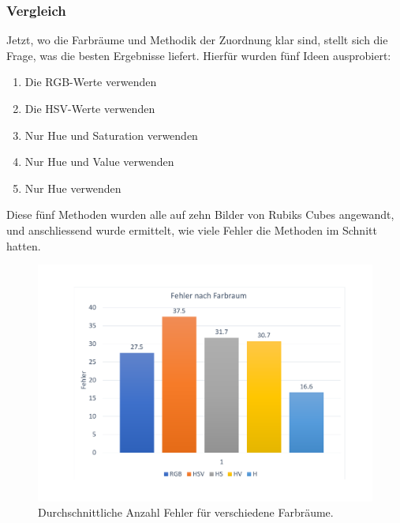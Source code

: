\documentclass[a4paper, 12pt]{article}
\begin{document}
\subsubsection{Vergleich}
Jetzt, wo die Farbräume und Methodik der Zuordnung klar sind, stellt sich die Frage, was die besten Ergebnisse liefert. Hierfür wurden fünf Ideen ausprobiert:
\begin{enumerate}
  \item Die RGB-Werte verwenden
  \item Die HSV-Werte verwenden
  \item Nur Hue und Saturation verwenden
  \item Nur Hue und Value verwenden
  \item Nur Hue verwenden
\end{enumerate}
Diese fünf Methoden wurden alle auf zehn Bilder von Rubiks Cubes angewandt, und anschliessend wurde ermittelt, wie viele Fehler die Methoden im Schnitt hatten. 
\begin{figure}[H]
\includegraphics[scale=0.4]{Fehler_nach_Methode}
\caption{Durchschnittliche Anzahl Fehler für verschiedene Farbräume.}
\end{figure}
\end{document}
